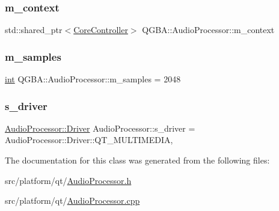 \subsubsection{\texorpdfstring{m\+\_\+context}{m\_context}}
{\footnotesize\ttfamily std\+::shared\+\_\+ptr$<$\mbox{\hyperlink{class_q_g_b_a_1_1_core_controller}{Core\+Controller}}$>$ Q\+G\+B\+A\+::\+Audio\+Processor\+::m\+\_\+context\hspace{0.3cm}{\ttfamily [private]}}

\mbox{\label{class_q_g_b_a_1_1_audio_processor_a7a112ba2bbdcb4a963b310dc78b60175}} 
\subsubsection{\texorpdfstring{m\+\_\+samples}{m\_samples}}
{\footnotesize\ttfamily \mbox{\hyperlink{ioapi_8h_a787fa3cf048117ba7123753c1e74fcd6}{int}} Q\+G\+B\+A\+::\+Audio\+Processor\+::m\+\_\+samples = 2048\hspace{0.3cm}{\ttfamily [private]}}

\mbox{\label{class_q_g_b_a_1_1_audio_processor_a5540cf3b98137028dec413f4bb669e59}} 
\subsubsection{\texorpdfstring{s\+\_\+driver}{s\_driver}}
{\footnotesize\ttfamily \mbox{\hyperlink{class_q_g_b_a_1_1_audio_processor_a49108637a6edef1b593f66701eb9b4bc}{Audio\+Processor\+::\+Driver}} Audio\+Processor\+::s\+\_\+driver = Audio\+Processor\+::\+Driver\+::\+Q\+T\+\_\+\+M\+U\+L\+T\+I\+M\+E\+D\+IA\hspace{0.3cm}{\ttfamily [static]}, {\ttfamily [private]}}



The documentation for this class was generated from the following files\+:\begin{DoxyCompactItemize}
\item 
src/platform/qt/\mbox{\hyperlink{_audio_processor_8h}{Audio\+Processor.\+h}}\item 
src/platform/qt/\mbox{\hyperlink{_audio_processor_8cpp}{Audio\+Processor.\+cpp}}\end{DoxyCompactItemize}
